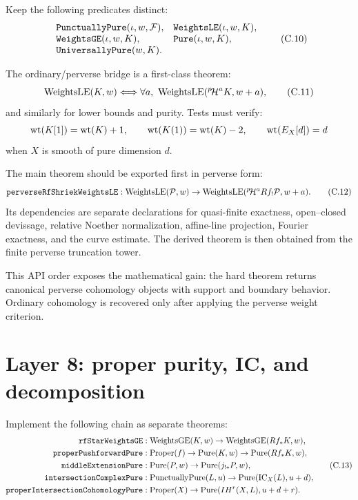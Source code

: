 Keep the following predicates distinct:
\[
\begin{array}{ll}
\texttt{PunctuallyPure}(\iota,w,\mathcal F),&
\texttt{WeightsLE}(\iota,w,K),\\
\texttt{WeightsGE}(\iota,w,K),&
\texttt{Pure}(\iota,w,K),\\
\texttt{UniversallyPure}(w,K).&
\end{array}
\tag{C.10}\label{eq:formalization-weight-predicates}
\]

The ordinary/perverse bridge is a first-class theorem:
\[
\operatorname{WeightsLE}(K,w)
\Longleftrightarrow
\forall a,\ 
\operatorname{WeightsLE}(\pH^aK,w+a),
\tag{C.11}\label{eq:formalization-perverse-weight-bridge}
\]
and similarly for lower bounds and purity.  Tests must verify:
\[
 \operatorname{wt}(K[1])=\operatorname{wt}(K)+1,\qquad
 \operatorname{wt}(K(1))=\operatorname{wt}(K)-2,\qquad
 \operatorname{wt}(E_X[d])=d
\]
when \(X\) is smooth of pure dimension \(d\).

The main theorem should be exported first in perverse form:
\[
\texttt{perverseRfShriekWeightsLE}:
\operatorname{WeightsLE}(\mathcal P,w)
\to
\operatorname{WeightsLE}({}^{p}\!\mathcal H^aRf_!\mathcal P,w+a).
\tag{C.12}\label{eq:formalization-perverse-direct-image}
\]
Its dependencies are separate declarations for quasi-finite exactness,
open--closed devissage, relative Noether normalization, affine-line
projection, Fourier exactness, and the curve estimate.  The derived theorem
is then obtained from the finite perverse truncation tower.

\begin{powerbox}
This API order exposes the mathematical gain: the hard theorem returns
canonical perverse cohomology objects with support and boundary behavior.
Ordinary cohomology is recovered only after applying the perverse weight
criterion.
\end{powerbox}

\section{Layer 8: proper purity, IC, and decomposition}

Implement the following chain as separate theorems:
\[
\begin{aligned}
\texttt{rfStarWeightsGE}&:
 \operatorname{WeightsGE}(K,w)\to
 \operatorname{WeightsGE}(Rf_*K,w),\\
\texttt{properPushforwardPure}&:
 \operatorname{Proper}(f)\to
 \operatorname{Pure}(K,w)\to
 \operatorname{Pure}(Rf_*K,w),\\
\texttt{middleExtensionPure}&:
 \operatorname{Pure}(P,w)\to
 \operatorname{Pure}(j_{!*}P,w),\\
\texttt{intersectionComplexPure}&:
 \operatorname{PunctuallyPure}(L,u)\to
 \operatorname{Pure}(\operatorname{IC}_X(L),u+d),\\
\texttt{properIntersectionCohomologyPure}&:
 \operatorname{Proper}(X)\to
 \operatorname{Pure}(IH^r(X,L),u+d+r).
\end{aligned}
\tag{C.13}\label{eq:formalization-proper-purity-chain}
\]

